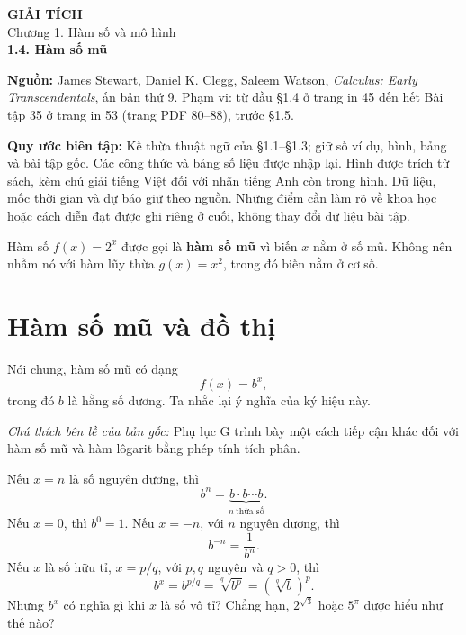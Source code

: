 \documentclass[12pt,a4paper]{article}
\begin{document}
\begin{center}
{\Large\bfseries GIẢI TÍCH}\\[5pt]
{\large Chương 1. Hàm số và mô hình}\\[9pt]
{\Large\bfseries 1.4. Hàm số mũ}
\end{center}
\noindent\textbf{Nguồn:} James Stewart, Daniel K. Clegg, Saleem Watson, \textit{Calculus: Early Transcendentals}, ấn bản thứ 9. Phạm vi: từ đầu §1.4 ở trang in 45 đến hết Bài tập 35 ở trang in 53 (trang PDF 80–88), trước §1.5.

\noindent\textbf{Quy ước biên tập:} Kế thừa thuật ngữ của §1.1–§1.3; giữ số ví dụ, hình, bảng và bài tập gốc. Các công thức và bảng số liệu được nhập lại. Hình được trích từ sách, kèm chú giải tiếng Việt đối với nhãn tiếng Anh còn trong hình. Dữ liệu, mốc thời gian và dự báo giữ theo nguồn. Những điểm cần làm rõ về khoa học hoặc cách diễn đạt được ghi riêng ở cuối, không thay đổi dữ liệu bài tập.

Hàm số $f(x)=2^x$ được gọi là \textbf{hàm số mũ} vì biến $x$ nằm ở số mũ. Không nên nhầm nó với hàm lũy thừa $g(x)=x^2$, trong đó biến nằm ở cơ số.

\section*{Hàm số mũ và đồ thị}
Nói chung, hàm số mũ có dạng
\[f(x)=b^x,\]
trong đó $b$ là hằng số dương. Ta nhắc lại ý nghĩa của ký hiệu này.

\noindent\textit{Chú thích bên lề của bản gốc:} Phụ lục G trình bày một cách tiếp cận khác đối với hàm số mũ và hàm lôgarit bằng phép tính tích phân.

Nếu $x=n$ là số nguyên dương, thì
\[b^n=\underbrace{b\cdot b\cdots b}_{n\ \text{thừa số}}.\]
Nếu $x=0$, thì $b^0=1$. Nếu $x=-n$, với $n$ nguyên dương, thì
\[b^{-n}=\frac1{b^n}.\]
Nếu $x$ là số hữu tỉ, $x=p/q$, với $p,q$ nguyên và $q>0$, thì
\[b^x=b^{p/q}=\sqrt[q]{b^p}=\left(\sqrt[q]b\right)^p.\]
Nhưng $b^x$ có nghĩa gì khi $x$ là số vô tỉ? Chẳng hạn, $2^{\sqrt3}$ hoặc $5^\pi$ được hiểu như thế nào?
\end{document}
